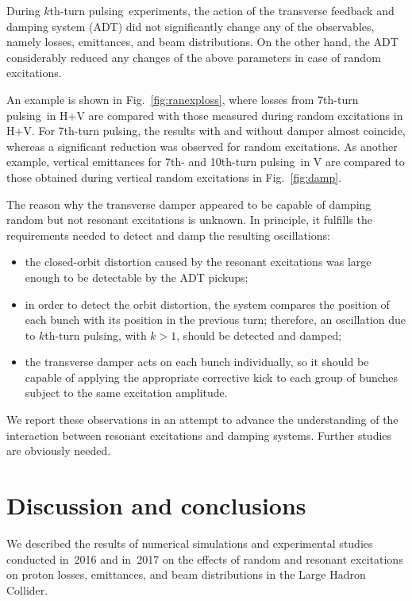 \documentclass[
prstab
,reprint
,linenumbers
,longbibliography
,preprintnumbers
,showkeys
,amsfonts,amssymb,amsmath
,floatfix
]{revtex4-1}
\newcommand{\kthtp}{$k$th-turn pulsing}
\newcommand{\seventhtp}{7th-turn pulsing}
\newcommand{\tenthtp}{10th-turn pulsing}
\begin{document}
During \kthtp\ experiments, the action of the transverse feedback and
damping system (ADT) did not significantly change any of the
observables, namely losses, emittances, and beam distributions. On the
other hand, the ADT considerably reduced any changes of the above
parameters in case of random excitations.

An example is shown in Fig.~\ref{fig:ranexploss}, where losses from
\seventhtp\ in H+V are compared with those measured during random
excitations in H+V. For \seventhtp, the results with and without
damper almost coincide, whereas a significant reduction was observed
for random excitations. As another example, vertical emittances for
7th- and \tenthtp\ in V are compared to those obtained during vertical
random excitations in Fig.~\ref{fig:damp}.

The reason why the transverse damper appeared to be capable of damping
random but not resonant excitations is unknown. In principle, it
fulfills the requirements needed to detect and damp the resulting
oscillations:
%
\begin{itemize}
\item the closed-orbit distortion caused by the resonant excitations
  was large enough to be detectable by the ADT pickups;
\item in order to detect the orbit distortion, the system compares the
  position of each bunch with its position in the previous turn;
  therefore, an oscillation due to \kthtp, with $k > 1$, should be
  detected and damped;
\item the transverse damper acts on each bunch individually, so it
  should be capable of applying the appropriate corrective kick to
  each group of bunches subject to the same excitation amplitude.
\end{itemize}

We report these observations in an attempt to advance the
understanding of the interaction between resonant excitations and
damping systems. Further studies are obviously needed.



\section{Discussion and conclusions}
\label{sec:sum}

We described the results of numerical simulations and experimental
studies conducted in~2016 and in~2017 on the effects of random and
resonant excitations on proton losses, emittances, and beam
distributions in the Large Hadron Collider.
\end{document}
